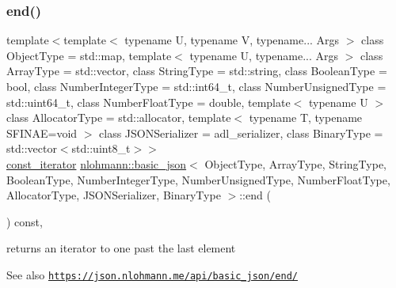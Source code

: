 \subsubsection{\texorpdfstring{end()}{end()}\hspace{0.1cm}{\footnotesize\ttfamily [2/2]}}
{\footnotesize\ttfamily template$<$template$<$ typename U, typename V, typename... Args $>$ class Object\+Type = std\+::map, template$<$ typename U, typename... Args $>$ class Array\+Type = std\+::vector, class String\+Type  = std\+::string, class Boolean\+Type  = bool, class Number\+Integer\+Type  = std\+::int64\+\_\+t, class Number\+Unsigned\+Type  = std\+::uint64\+\_\+t, class Number\+Float\+Type  = double, template$<$ typename U $>$ class Allocator\+Type = std\+::allocator, template$<$ typename T, typename S\+F\+I\+N\+A\+E=void $>$ class J\+S\+O\+N\+Serializer = adl\+\_\+serializer, class Binary\+Type  = std\+::vector$<$std\+::uint8\+\_\+t$>$$>$ \\
\hyperlink{classnlohmann_1_1basic__json_aebd2cfa7e4ded4e97cde9269bfeeea38}{const\+\_\+iterator} \hyperlink{classnlohmann_1_1basic__json}{nlohmann\+::basic\+\_\+json}$<$ Object\+Type, Array\+Type, String\+Type, Boolean\+Type, Number\+Integer\+Type, Number\+Unsigned\+Type, Number\+Float\+Type, Allocator\+Type, J\+S\+O\+N\+Serializer, Binary\+Type $>$\+::end (\begin{DoxyParamCaption}{ }\end{DoxyParamCaption}) const\hspace{0.3cm}{\ttfamily [inline]}, {\ttfamily [noexcept]}}



returns an iterator to one past the last element 

\begin{DoxySeeAlso}{See also}
\href{https://json.nlohmann.me/api/basic_json/end/}{\tt https\+://json.\+nlohmann.\+me/api/basic\+\_\+json/end/} 
\end{DoxySeeAlso}
\mbox{\label{classnlohmann_1_1basic__json_a494632b69bbe1d0153d3bedad0901b8e}} 
